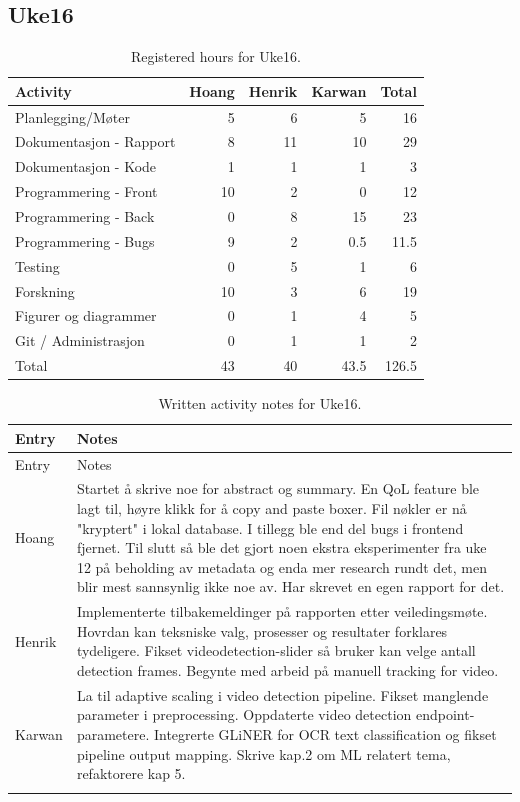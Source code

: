 \subsection{Uke16}

\begin{table}[H]
\centering
\small
\caption{Registered hours for Uke16.}
\label{tab:project-hours-uke16}
\begin{tabular}{lrrrr}
\toprule
Activity & Hoang & Henrik & Karwan & Total \\
\midrule
Planlegging/Møter & 5 & 6 & 5 & 16 \\
Dokumentasjon - Rapport & 8 & 11 & 10 & 29 \\
Dokumentasjon - Kode & 1 & 1 & 1 & 3 \\
Programmering - Front & 10 & 2 & 0 & 12 \\
Programmering - Back & 0 & 8 & 15 & 23 \\
Programmering - Bugs & 9 & 2 & 0.5 & 11.5 \\
Testing & 0 & 5 & 1 & 6 \\
Forskning & 10 & 3 & 6 & 19 \\
Figurer og diagrammer & 0 & 1 & 4 & 5 \\
Git / Administrasjon & 0 & 1 & 1 & 2 \\
\midrule
Total & 43 & 40 & 43.5 & 126.5 \\
\bottomrule
\end{tabular}
\end{table}

\begin{longtable}{p{}p{}}
\caption{Written activity notes for Uke16.}\\
\toprule
Entry & Notes \\
\midrule
\endfirsthead
\toprule
Entry & Notes \\
\midrule
\endhead
Hoang & Startet å skrive noe for abstract og summary. En QoL feature ble lagt til, høyre klikk for å copy and paste boxer. Fil nøkler er nå "kryptert" i lokal database. I tillegg ble end del bugs i frontend fjernet. Til slutt så ble det gjort noen ekstra eksperimenter fra uke 12 på beholding av metadata og enda mer research rundt det, men blir mest sannsynlig ikke noe av. Har skrevet en egen rapport for det. \\
\addlinespace
Henrik & Implementerte tilbakemeldinger på rapporten etter veiledingsmøte. Hovrdan kan teksniske valg, prosesser og resultater forklares tydeligere. Fikset videodetection-slider så bruker kan velge antall detection frames. Begynte med arbeid på manuell tracking for video. \\
\addlinespace
Karwan & La til adaptive scaling i video detection pipeline. Fikset manglende parameter i preprocessing. Oppdaterte video detection endpoint-parametere. Integrerte GLiNER for OCR text classification og fikset pipeline output mapping. Skrive kap.2 om ML relatert tema, refaktorere kap 5. \\
\addlinespace
\bottomrule
\end{longtable}

